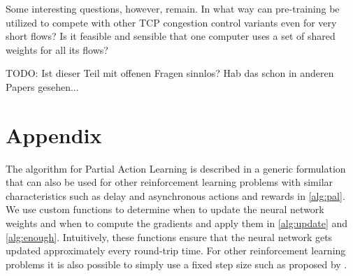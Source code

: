 \documentclass[sigconf]{acmart}
\newcommand\note[2]{{\color{#1}#2}}
\newcommand\todo[1]{{\note{red}{TODO: #1}}}
\begin{document}
Some interesting questions, however, remain. In what way can pre-training be utilized to compete with other TCP congestion control variants even for very short flows? Is it feasible and sensible that one computer uses a set of shared weights for all its flows?

\todo{Ist dieser Teil mit offenen Fragen sinnlos? Hab das schon in anderen Papers gesehen...}

\section*{Appendix}	

The algorithm for Partial Action Learning is described in a generic formulation that can also be used for other reinforcement learning problems with similar characteristics such as delay and asynchronous actions and rewards in \autoref{alg:pal}. We use custom functions to determine when to update the neural network weights and when to compute the gradients and apply them in \autoref{alg:update} and \autoref{alg:enough}. Intuitively, these functions ensure that the neural network gets updated approximately every round-trip time. For other reinforcement learning problems it is also possible to simply use a fixed step size such as proposed by \cite{mnih_asynchronous_2016}.
\end{document}
